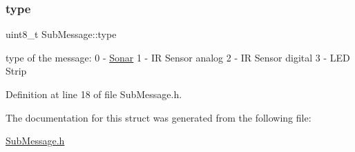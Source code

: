 \subsubsection{\texorpdfstring{type}{type}}
{\footnotesize\ttfamily uint8\+\_\+t Sub\+Message\+::type}



type of the message\+: 0 -\/ \hyperlink{class_sonar}{Sonar} 1 -\/ IR Sensor analog 2 -\/ IR Sensor digital 3 -\/ L\+ED Strip 



Definition at line 18 of file Sub\+Message.\+h.



The documentation for this struct was generated from the following file\+:\begin{DoxyCompactItemize}
\item 
\hyperlink{_sub_message_8h}{Sub\+Message.\+h}\end{DoxyCompactItemize}
